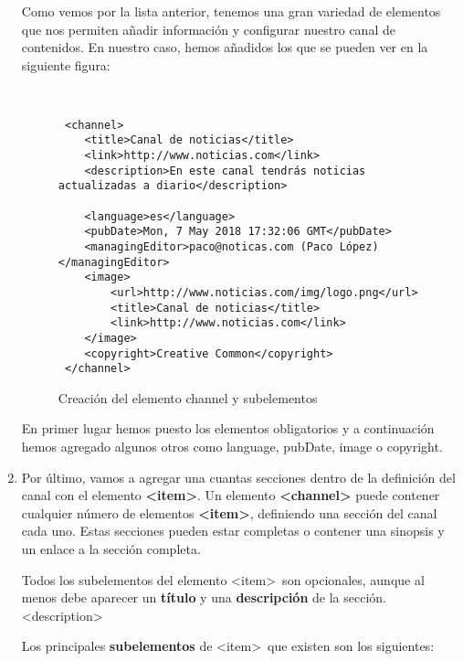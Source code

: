 \begin{enumerate}
    Como vemos por la lista anterior, tenemos una gran variedad de elementos que nos permiten añadir información y configurar nuestro canal de contenidos. En nuestro caso, hemos añadidos los que se pueden ver en la siguiente figura:

    \begin{figure}[h]
        \begin{tcolorbox}[sharp corners, colback=yellow!30, colframe=white!20]
            \scriptsize
            \begin{verbatim}


 <channel>
    <title>Canal de noticias</title>
    <link>http://www.noticias.com</link>
    <description>En este canal tendrás noticias actualizadas a diario</description>

    <language>es</language>
    <pubDate>Mon, 7 May 2018 17:32:06 GMT</pubDate>
    <managingEditor>paco@noticas.com (Paco López)</managingEditor>
    <image>
        <url>http://www.noticias.com/img/logo.png</url>
        <title>Canal de noticias</title>
        <link>http://www.noticias.com</link>
    </image>
    <copyright>Creative Common</copyright>
 </channel>
            \end{verbatim}
        \end{tcolorbox}
        \caption{Creación del elemento channel y subelementos}
    \end{figure}

    En primer lugar hemos puesto los elementos obligatorios y a continuación hemos agregado algunos otros como language, pubDate, image o copyright.

    \item Por último, vamos a agregar una cuantas secciones dentro de la definición del canal con el elemento \textbf{<item>}. Un elemento \textbf{<channel>} puede contener cualquier número de elementos \textbf{<item>}, definiendo una sección del canal cada uno. Estas secciones pueden estar completas o contener una sinopsis y un enlace a la sección completa.

    Todos los subelementos del elemento <item>\ son opcionales, aunque al menos debe aparecer un \textbf{título} y una \textbf{descripción} de la sección.  <description>

    Los principales \textbf{subelementos} de <item>\ que existen son los siguientes:


\end{enumerate}
